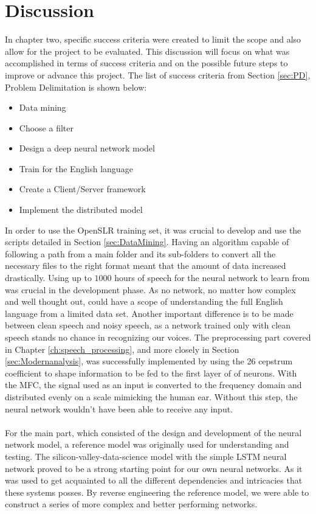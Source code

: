 \chapter{Discussion}\label{ch:discussion}

In chapter two, specific success criteria were created to limit the scope and also allow for the project to be evaluated. This discussion will focus on what was accomplished in terms of success criteria and on the possible future steps to improve or advance this project. The list of success criteria from Section \ref{sec:PD}, Problem Delimitation is shown below:
\begin{itemize}
    \item Data mining
    \item Choose a filter
    \item Design a deep neural network model
    \item Train for the English language
    \item Create a Client/Server framework
    \item Implement the distributed model
\end{itemize} 
In order to use the OpenSLR training set, it was crucial to develop and use the 
scripts detailed in Section \ref{sec:DataMining}.
 Having an algorithm capable of following a path from a main folder and its sub-folders to convert all the necessary files to the right format meant that the 
 amount of data increased drastically.
  Using up to $1000$ hours of speech for the neural network to learn from was 
  crucial in the development phase. 
  As no network, no matter how complex and well thought out, could have a scope of 
  understanding the full English language from a limited data set. 
  Another important difference is to be made between clean speech and noisy speech, 
  as a network trained only with clean speech stands no chance in recognizing our 
  voices. 
  The preprocessing part covered in Chapter \ref{ch:speech_processing}, and more
   closely in Section \ref{sec:Modernanalysis}, was  successfully implemented by 
   using the 26 cepstrum coefficient to shape information to be fed to the first 
   layer of of neurons. With the MFC, the signal used as an input is converted to the frequency
   domain and distributed evenly on a scale mimicking the human ear. Without this step, the neural
   network wouldn't have been able to receive any input.\\\\
For the main part, which consisted of the design and development of the neural network model, a reference model was originally used for understanding and testing. The silicon-valley-data-science model with the simple LSTM neural network proved to be a strong starting point for our own neural networks. As it was used to get acquainted to all the different dependencies and intricacies that these systems posses. By reverse engineering the reference model, we were able to construct a series of more complex and better performing networks.\\\\ 
